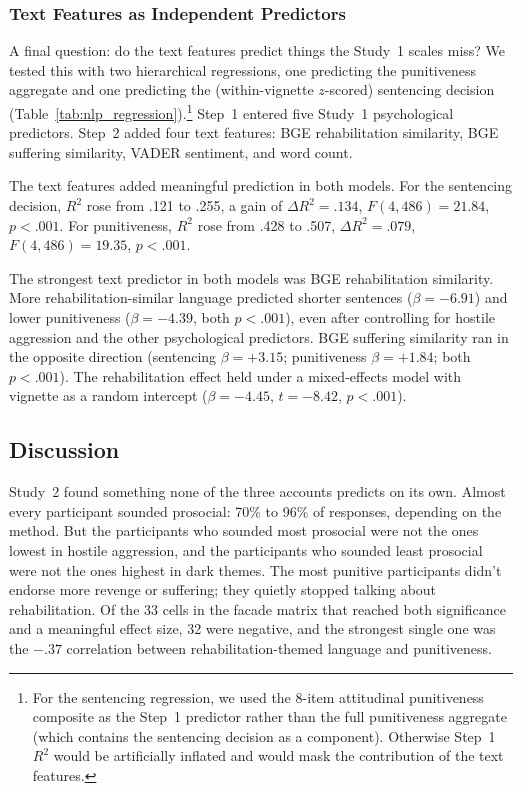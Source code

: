 \subsubsection{Text Features as Independent Predictors}

A final question: do the text features predict things the Study~1 scales miss? We tested this with two hierarchical regressions, one predicting the punitiveness aggregate and one predicting the (within-vignette $z$-scored) sentencing decision (Table~\ref{tab:nlp_regression}).\footnote{For the sentencing regression, we used the 8-item attitudinal punitiveness composite as the Step~1 predictor rather than the full punitiveness aggregate (which contains the sentencing decision as a component). Otherwise Step~1 $R^2$ would be artificially inflated and would mask the contribution of the text features.} Step~1 entered five Study~1 psychological predictors. Step~2 added four text features: BGE rehabilitation similarity, BGE suffering similarity, VADER sentiment, and word count.

The text features added meaningful prediction in both models. For the sentencing decision, $R^2$ rose from .121 to .255, a gain of $\Delta R^2 = .134$, $F(4, 486) = 21.84$, $p < .001$. For punitiveness, $R^2$ rose from .428 to .507, $\Delta R^2 = .079$, $F(4, 486) = 19.35$, $p < .001$.

The strongest text predictor in both models was BGE rehabilitation similarity. More rehabilitation-similar language predicted shorter sentences ($\beta = -6.91$) and lower punitiveness ($\beta = -4.39$, both $p < .001$), even after controlling for hostile aggression and the other psychological predictors. BGE suffering similarity ran in the opposite direction (sentencing $\beta = +3.15$; punitiveness $\beta = +1.84$; both $p < .001$). The rehabilitation effect held under a mixed-effects model with vignette as a random intercept ($\beta = -4.45$, $t = -8.42$, $p < .001$).

\subsection{Discussion}

Study~2 found something none of the three accounts predicts on its own. Almost every participant sounded prosocial: 70\% to 96\% of responses, depending on the method. But the participants who sounded most prosocial were not the ones lowest in hostile aggression, and the participants who sounded least prosocial were not the ones highest in dark themes. The most punitive participants didn't endorse more revenge or suffering; they quietly stopped talking about rehabilitation. Of the 33 cells in the facade matrix that reached both significance and a meaningful effect size, 32 were negative, and the strongest single one was the $-.37$ correlation between rehabilitation-themed language and punitiveness.

